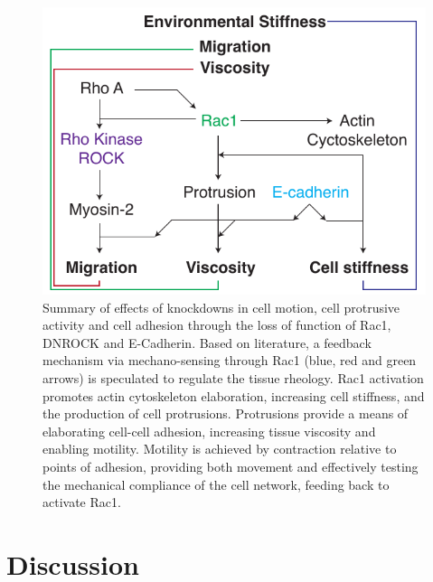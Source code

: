 \begin{figure}
 \centering
 \includegraphics{Chapters/tweezers/Figs/PDF/interconnected_protein_signalling}
 \caption[Summary of effects of knockdowns in cell motion, cell protrusive activity and cell adhesion through the loss of function of \gls{Rac1}, \gls{DNROCK} and E-Cadherin]{
 Summary of effects of knockdowns in cell motion, cell protrusive activity and cell adhesion through the loss of function of \gls{Rac1}, \gls{DNROCK} and E-Cadherin.
 Based on literature, a feedback mechanism via mechano-sensing through \gls{Rac1} (blue, red and green arrows) is speculated to regulate the tissue rheology.
 \gls{Rac1} activation promotes actin cytoskeleton elaboration, increasing cell stiffness, and the production of cell protrusions.
 Protrusions provide a means of elaborating cell-cell adhesion, increasing tissue viscosity and enabling motility.
 Motility is achieved by contraction relative to points of adhesion, providing both movement and effectively testing the mechanical compliance of the cell network, feeding back to activate \gls{Rac1}.
 }\label{fig:interconnected_protein_signalling}
\end{figure}

\section{Discussion}


